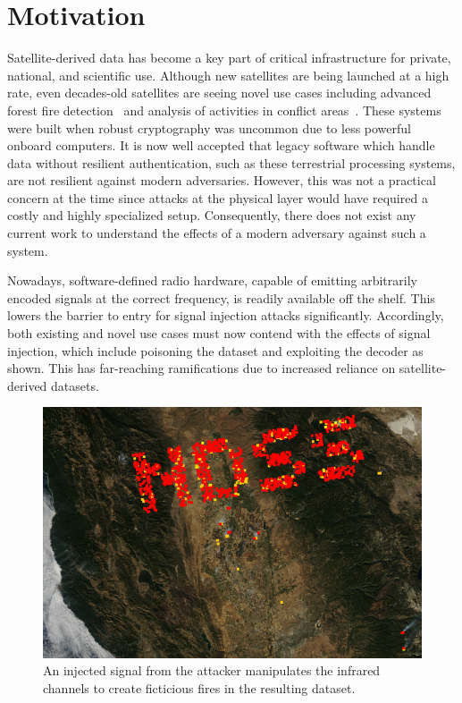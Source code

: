 \section{Motivation}

Satellite-derived data has become a key part of critical infrastructure for private, national, and scientific use.
Although new satellites are being launched at a high rate, even decades-old satellites are seeing novel use cases including advanced forest fire detection~\cite{nasaFirms} and analysis of activities in conflict areas~\cite{separatistLuminosity}. %
These systems were built when robust cryptography was uncommon due to less powerful onboard computers.
It is now well accepted that legacy software which handle data without resilient authentication, such as these terrestrial processing systems, are not resilient against modern adversaries.
However, this was not a practical concern at the time since attacks at the physical layer would have required a costly and highly specialized setup.
Consequently, there does not exist any current work to understand the effects of a modern adversary against such a system.

Nowadays, software-defined radio hardware, capable of emitting arbitrarily encoded signals at the correct frequency, is readily available off the shelf. %
This lowers the barrier to entry for signal injection attacks significantly.
Accordingly, both existing and novel use cases must now contend with the effects of signal injection, which include poisoning the dataset and exploiting the decoder as shown.
This has far-reaching ramifications due to increased reliance on satellite-derived datasets.

\begin{figure}
    \includegraphics[width=\columnwidth]{diagrams/injection/pixels_800_140.jpg}
    \caption{An injected signal from the attacker manipulates the infrared channels to create ficticious fires in the resulting dataset.}
    \label{fig:location-injection}
\end{figure}

